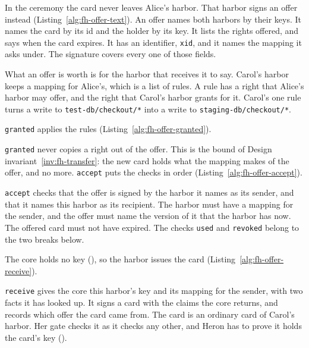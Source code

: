In the ceremony the card never leaves Alice's harbor. That harbor signs an
offer instead (Listing~\ref{alg:fh-offer-text}). An offer names both
harbors by their keys. It names the card by its id and the holder by its
key. It lists the rights offered, and says when the card expires. It has
an identifier, \texttt{xid}, and it names the mapping it asks under. The
signature covers every one of those fields.

What an offer is worth is for the harbor that receives it to say. Carol's
harbor keeps a mapping for Alice's, which is a list of rules. A rule has a
right that Alice's harbor may offer, and the right that Carol's harbor
grants for it. Carol's one rule turns a write to
\texttt{test-db/checkout/*} into a write to
\texttt{staging-db/checkout/*}.


\texttt{granted} applies the rules (Listing~\ref{alg:fh-offer-granted}).


\texttt{granted} never copies a right out of the offer. This is the bound
of Design invariant~\ref{inv:fh-transfer}: the new card holds what the
mapping makes of the offer, and no more. \texttt{accept} puts the checks
in order (Listing~\ref{alg:fh-offer-accept}).


\texttt{accept} checks that the offer is signed by the harbor it names as
its sender, and that it names this harbor as its recipient. The harbor
must have a mapping for the sender, and the offer must name the version of
it that the harbor has now. The offered card must not have expired. The
checks \texttt{used} and \texttt{revoked} belong to the two breaks below.

The core holds no key
(), so the harbor issues the
card (Listing~\ref{alg:fh-offer-receive}).


\texttt{receive} gives the core this harbor's key and its mapping for the
sender, with two facts it has looked up. It signs a card
with the claims the core returns, and records which offer the card came
from. The card is an ordinary card of Carol's harbor. Her gate checks it
as it checks any other, and Heron has to prove it holds the card's key
().

